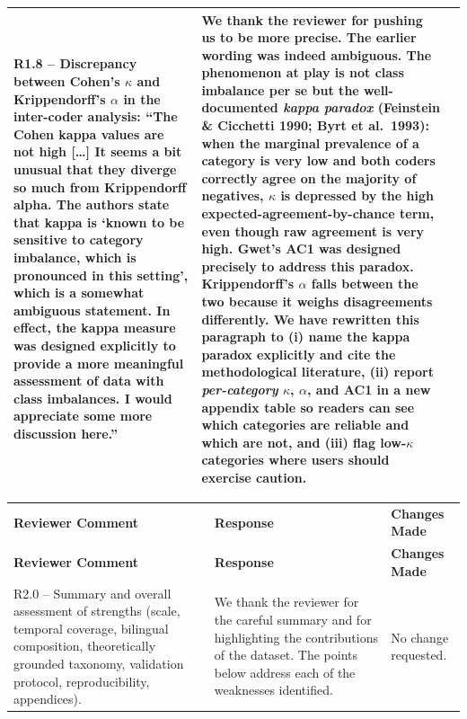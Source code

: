 \documentclass[11pt]{article}
\begin{document}
\begin{landscape}
\begin{longtable}{|L{4cm}|L{12cm}|L{9cm}|}
R1.8 -- Discrepancy between Cohen's $\kappa$ and Krippendorff's $\alpha$ in the inter-coder analysis: \enquote{The Cohen kappa values are not high [\dots] It seems a bit unusual that they diverge so much from Krippendorff alpha. The authors state that kappa is \enquote{known to be sensitive to category imbalance, which is pronounced in this setting}, which is a somewhat ambiguous statement. In effect, the kappa measure was designed explicitly to provide a more meaningful assessment of data with class imbalances. I would appreciate some more discussion here.} &
We thank the reviewer for pushing us to be more precise. The earlier wording was indeed ambiguous. The phenomenon at play is not class imbalance per se but the well-documented \emph{kappa paradox} (Feinstein \& Cicchetti 1990; Byrt et al.\ 1993): when the marginal prevalence of a category is very low and both coders correctly agree on the majority of negatives, $\kappa$ is depressed by the high expected-agreement-by-chance term, even though raw agreement is very high. Gwet's AC1 was designed precisely to address this paradox. Krippendorff's $\alpha$ falls between the two because it weighs disagreements differently. We have rewritten this paragraph to (i) name the kappa paradox explicitly and cite the methodological literature, (ii) report \emph{per-category} $\kappa$, $\alpha$, and AC1 in a new appendix table so readers can see which categories are reliable and which are not, and (iii) flag low-$\kappa$ categories where users should exercise caution. &
\\
\hline

\end{longtable}



\begin{longtable}{|L{4cm}|L{12cm}|L{9cm}|}
\hline
{}
 \\
\hline
\textbf{Reviewer Comment} & \textbf{Response} & \textbf{Changes Made} \\
\hline
\endfirsthead
\hline
{}
\textbf{Reviewer Comment} & \textbf{Response} & \textbf{Changes Made} \\
\hline
\endhead

R2.0 -- Summary and overall assessment of strengths (scale, temporal coverage, bilingual composition, theoretically grounded taxonomy, validation protocol, reproducibility, appendices). &
We thank the reviewer for the careful summary and for highlighting the contributions of the dataset. The points below address each of the weaknesses identified. &
No change requested. \\
\hline


\end{longtable}
\end{landscape}
\end{document}
